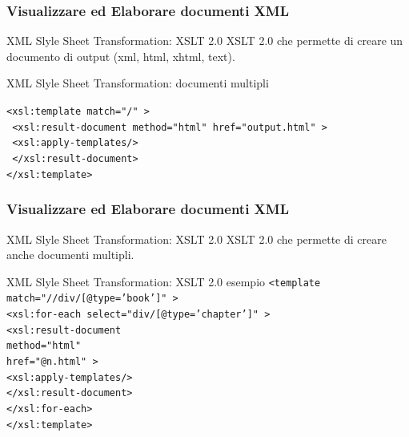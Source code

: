 \begin{frame}
    \frametitle{Visualizzare ed Elaborare documenti XML}
    \addtocounter{nframe}{1}
    

     \begin{block}{XML Slyle Sheet Transformation: XSLT 2.0}
        XSLT 2.0 che permette di creare un documento di output (xml, html, xhtml, text).
     \end{block}

     \begin{block}{XML Slyle Sheet Transformation: documenti multipli}
       
        \texttt{<xsl:template match="/" >}
        \\\texttt{ <xsl:result-document method="html" href="output.html" >}
        \\\texttt{ <xsl:apply-templates/>}
        \\\texttt{ </xsl:result-document>}
        \\\texttt{</xsl:template>}
            
     \end{block}

\end{frame}

\begin{frame}
    \frametitle{Visualizzare ed Elaborare documenti XML}
    \addtocounter{nframe}{1}
    

     \begin{block}{XML Slyle Sheet Transformation: XSLT 2.0}
        XSLT 2.0 che permette di creare anche documenti multipli.
     \end{block}

     \begin{block}{XML Slyle Sheet Transformation: XSLT 2.0 esempio}
        \texttt{<template match="//div/[@type='book']" >}
        \\\texttt{<xsl:for-each select="div/[@type='chapter']" >}
        \\\texttt{<xsl:result-document}
           \\\texttt{method="html"}
           \\\texttt{href="{@n}.html" >}
           \\\texttt{<xsl:apply-templates/>}
        \\\texttt{</xsl:result-document>}
        \\\texttt{</xsl:for-each>}
        \\\texttt{</xsl:template>}
    
    \end{block}

\end{frame}

